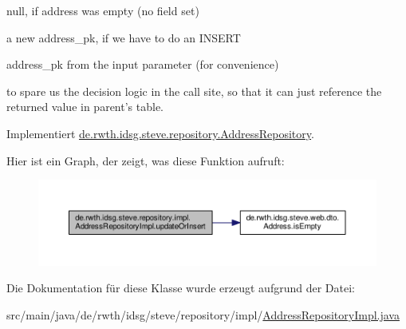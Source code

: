 \begin{DoxyItemize}
\item null, if address was empty (no field set)
\item a new address\+\_\+pk, if we have to do an I\+N\+S\+E\+R\+T
\item address\+\_\+pk from the input parameter (for convenience)
\end{DoxyItemize}

to spare us the decision logic in the call site, so that it can just reference the returned value in parent's table. 

Implementiert \hyperlink{interfacede_1_1rwth_1_1idsg_1_1steve_1_1repository_1_1_address_repository_a35873a3790f0f03326015bb90a64a5f8}{de.\+rwth.\+idsg.\+steve.\+repository.\+Address\+Repository}.



Hier ist ein Graph, der zeigt, was diese Funktion aufruft\+:\nopagebreak
\begin{figure}[H]
\begin{center}
\leavevmode
\includegraphics[width=350pt]{classde_1_1rwth_1_1idsg_1_1steve_1_1repository_1_1impl_1_1_address_repository_impl_a4e69d0f515bee3064f3b846fb046aa80_cgraph}
\end{center}
\end{figure}




Die Dokumentation für diese Klasse wurde erzeugt aufgrund der Datei\+:\begin{DoxyCompactItemize}
\item 
src/main/java/de/rwth/idsg/steve/repository/impl/\hyperlink{_address_repository_impl_8java}{Address\+Repository\+Impl.\+java}\end{DoxyCompactItemize}
